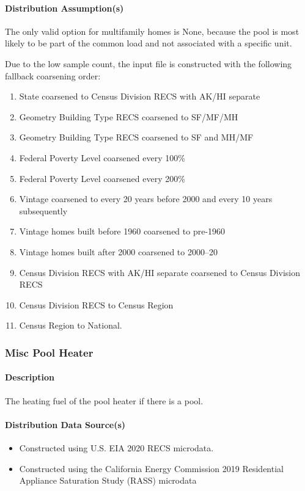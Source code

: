 \paragraph{Distribution Assumption(s)}
The only valid option for multifamily homes is None, because the pool is most likely to be part of the common load and not associated with a specific unit. 

Due to the low sample count, the input file is constructed with the following fallback coarsening order: 
\begin{enumerate}
    \item State coarsened to Census Division RECS with AK/HI separate 
    \item  Geometry Building Type RECS coarsened to SF/MF/MH 
    \item  Geometry Building Type RECS coarsened to SF and MH/MF 
    \item  Federal Poverty Level coarsened every 100\% 
    \item Federal Poverty Level coarsened every 200\% 
    \item Vintage coarsened to every 20 years before 2000 and every 10 years subsequently 
    \item  Vintage homes built before 1960 coarsened to pre-1960 
    \item Vintage homes built after 2000 coarsened to 2000--20 
    \item Census Division RECS with AK/HI separate coarsened to Census Division RECS 
    \item Census Division RECS to Census Region 
    \item Census Region to National.
\end{enumerate}

\subsubsection{Misc Pool Heater}
\paragraph{Description}
The heating fuel of the pool heater if there is a pool.

\paragraph{Distribution Data Source(s)}
\begin{itemize}
    \item Constructed using U.S. EIA 2020 RECS microdata.
    \item Constructed using the California Energy Commission 2019 Residential Appliance Saturation Study (RASS) microdata 
\end{itemize} 

